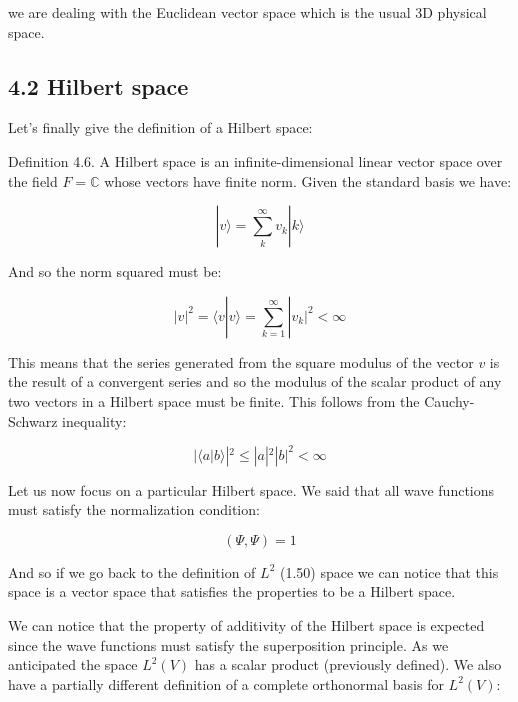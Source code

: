 \documentclass[italian]{HKNdocument}
\begin{document}
we are dealing with the Euclidean vector space which is the usual 3D physical space.


\subsection*{4.2 Hilbert space}

Let's finally give the definition of a Hilbert space:

Definition 4.6. A Hilbert space is an infinite-dimensional linear vector space over the field $F = \mathbb{C}$ whose vectors have finite norm. Given the standard basis we have:

\begin{equation*}
|v\rangle = \sum_{k}^{\infty} v_k|k\rangle \tag{4.13}
\end{equation*}

And so the norm squared must be:

\begin{equation*}
|v|^2 = \langle v|v\rangle = \sum_{k=1}^{\infty}|v_k|^2 < \infty \tag{4.14}
\end{equation*}

This means that the series generated from the square modulus of the vector $v$ is the result of a convergent series and so the modulus of the scalar product of any two vectors in a Hilbert space must be finite. This follows from the Cauchy-Schwarz inequality:

\begin{equation*}
|\langle a|b\rangle|^2 \leq |a|^2|b|^2 < \infty \tag{4.15}
\end{equation*}

Let us now focus on a particular Hilbert space. We said that all wave functions must satisfy the normalization condition:

\begin{equation*}
(\Psi, \Psi) = 1 \tag{4.16}
\end{equation*}

And so if we go back to the definition of $L^2$ (1.50) space we can notice that this space is a vector space that satisfies the properties to be a Hilbert space.

We can notice that the property of additivity of the Hilbert space is expected since the wave functions must satisfy the superposition principle. As we anticipated the space $L^2(V)$ has a scalar product (previously defined). We also have a partially different definition of a complete orthonormal basis for $L^2(V)$:
\end{document}
